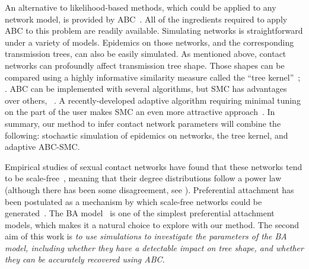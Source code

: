  An
alternative to likelihood-based methods, which could be applied to any network
model, is provided by \gls{ABC}~\autocite{rubin1984bayesianly,
tavare1997inferring, fu1997estimating, beaumont2002approximate}. All of the
ingredients required to apply \gls{ABC} to this problem are readily available.
Simulating networks is straightforward under a variety of models. Epidemics on
those networks, and the corresponding transmission trees, can also be easily
simulated. As mentioned above, contact networks can profoundly affect
transmission tree shape. Those shapes can be compared using a highly
informative similarity measure called the ``tree
kernel''~\autocite{poon2013mapping}; . \Gls{ABC} can be implemented with several
algorithms, but \gls{SMC} has advantages over others,
~\autocite{mckinley2009inference}. A recently-developed
adaptive algorithm requiring minimal tuning on the part of the user makes
\gls{SMC} an even more attractive approach~\autocite{del2012adaptive}. In
summary, our method to infer contact network parameters will combine the
following: stochastic simulation of epidemics on networks, the tree kernel, and
adaptive \gls{ABC}-\gls{SMC}. 

Empirical studies of sexual contact networks have found that these networks
tend to be scale-free~\autocite{colgate1989risk, liljeros2001web,
schneeberger2004scale,clemenccon2015statistical}, meaning that their degree
distributions follow a power law (although there has been some disagreement,
see \autocite{handcock2004likelihood, bansal2007individual}). Preferential
attachment has been postulated as a mechanism by which scale-free networks
could be generated~\autocite{barabasi1999emergence}. The \gls{BA}
model~\autocite{barabasi1999emergence} is one of the simplest preferential
attachment models, which makes it a natural choice to explore with our method.
The second aim of this work is \emph{to use simulations to investigate the
parameters of the \acrlong{BA} model, including whether they have a detectable
impact on tree shape, and whether they can be accurately recovered using
\gls{ABC}.}

